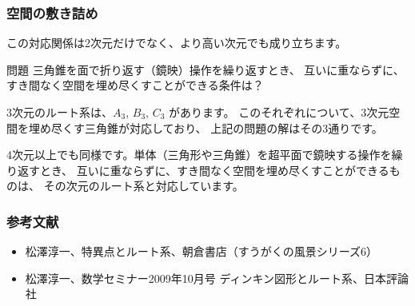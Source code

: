 \documentclass{beamer}
\begin{document}
\begin{frame}
    \frametitle{空間の敷き詰め}

    この対応関係は2次元だけでなく、より高い次元でも成り立ちます。

    \bigskip

    \begin{block}{問題}
        三角錐を面で折り返す（鏡映）操作を繰り返すとき、
        互いに重ならずに、すき間なく空間を埋め尽くすことができる条件は？
    \end{block}

    3次元のルート系は、\(A_3\), \(B_3\), \(C_3\) があります。
    このそれぞれについて、3次元空間を埋め尽くす三角錐が対応しており、
    上記の問題の解はその3通りです。

    \bigskip

    4次元以上でも同様です。単体（三角形や三角錐）を超平面で鏡映する操作を繰り返すとき、
    互いに重ならずに、すき間なく空間を埋め尽くすことができるものは、
    その次元のルート系と対応しています。
\end{frame}

\begin{frame}
    \frametitle{参考文献}

    \begin{itemize}
        \item 松澤淳一、特異点とルート系、朝倉書店（すうがくの風景シリーズ6）
        \item 松澤淳一、数学セミナー2009年10月号 ディンキン図形とルート系、日本評論社
    \end{itemize}
\end{frame}
\end{document}
